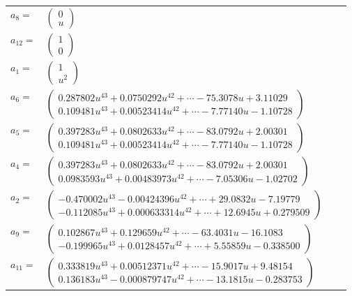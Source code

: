 \documentclass[1p]{elsarticle_modified}
\theoremstyle{definition}
\begin{document}
\begin{tabular}{m{7pt} m{180pt} m{7pt} m{180pt} }
\flushright $a_{8}=$&$\begin{pmatrix}0\\u\end{pmatrix}$ \\
\flushright $a_{12}=$&$\begin{pmatrix}1\\0\end{pmatrix}$ \\
\flushright $a_{1}=$&$\begin{pmatrix}1\\u^2\end{pmatrix}$ \\
\flushright $a_{6}=$&$\begin{pmatrix}0.287802 u^{43}+0.0750292 u^{42}+\cdots-75.3078 u+3.11029\\0.109481 u^{43}+0.00523414 u^{42}+\cdots-7.77140 u-1.10728\end{pmatrix}$ \\
\flushright $a_{5}=$&$\begin{pmatrix}0.397283 u^{43}+0.0802633 u^{42}+\cdots-83.0792 u+2.00301\\0.109481 u^{43}+0.00523414 u^{42}+\cdots-7.77140 u-1.10728\end{pmatrix}$ \\
\flushright $a_{4}=$&$\begin{pmatrix}0.397283 u^{43}+0.0802633 u^{42}+\cdots-83.0792 u+2.00301\\0.0983593 u^{43}+0.00483973 u^{42}+\cdots-7.05306 u-1.02702\end{pmatrix}$ \\
\flushright $a_{2}=$&$\begin{pmatrix}-0.470002 u^{43}-0.00424396 u^{42}+\cdots+29.0832 u-7.19779\\-0.112085 u^{43}+0.000633314 u^{42}+\cdots+12.6945 u+0.279509\end{pmatrix}$ \\
\flushright $a_{9}=$&$\begin{pmatrix}0.102867 u^{43}+0.129659 u^{42}+\cdots-63.4031 u-16.1083\\-0.199965 u^{43}+0.0128457 u^{42}+\cdots+5.55859 u-0.338500\end{pmatrix}$ \\
\flushright $a_{11}=$&$\begin{pmatrix}0.333819 u^{43}+0.00512371 u^{42}+\cdots-15.9017 u+9.48154\\0.136183 u^{43}-0.000879747 u^{42}+\cdots-13.1815 u-0.283753\end{pmatrix}$ \\

\end{tabular}
\end{document}
